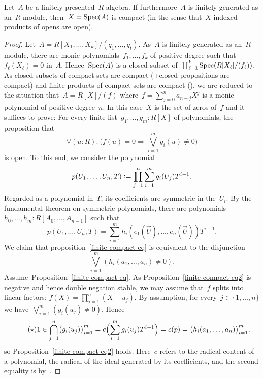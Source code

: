 \begin{proposition}\label{finite-compact}
Let~$A$ be a finitely presented~$R$-algebra. If furthermore~$A$ is finitely
generated as an~$R$-module, then~$X = \operatorname{Spec}(A)$ is compact (in the sense
that~$X$-indexed products of opens are open).\end{proposition}

\begin{proof}Let~$A = R[X_1,\ldots,X_k]/(q_1,\ldots,q_t)$. As~$A$ is finitely
generated as an~$R$-module, there are monic polynomials~$f_1,\ldots,f_k$ of
positive degree such that~$f_\ell(X_\ell) = 0$ in~$A$. Hence~$\operatorname{Spec}(A)$ is a
closed subset of~$\prod_{\ell=1}^k \operatorname{Spec}(R[X_\ell]/(f_\ell))$. As closed
subsets of compact sets are compact (\cite[Lemma 2.0.3]{proper-draft}+closed propositions are compact) and finite products
of compact sets are compact (\cite[Lemma 2.0.3]{proper-draft}), we are reduced to the
situation that~$A = R[X]/(f)$ where~$f = \sum_{j=0}^n a_{n-j} X^j$ is a monic
polynomial of positive degree~$n$. In this case~$X$ is the set of zeros of~$f$
and it suffices to prove: For every finite list~$g_1,\ldots,g_m : R[X]$ of
polynomials, the proposition that
\begin{equation}\label{finite-compact-eq}
  \tag{$\dagger$}
  \forall(u : R).\ \bigl(f(u) = 0 \Rightarrow \bigvee_{i=1}^m g_i(u) \neq 0\bigr)
\end{equation}
is open. To this end, we consider the polynomial
\[ p(U_1,\ldots,U_n,T) \vcentcolon= \prod_{j=1}^n \sum_{i=1}^m g_i(U_j) T^{i-1}. \]
Regarded as a polynomial in~$T$, its coefficients are symmetric in the~$U_i$.
By the fundamental theorem on symmetric polynomials, there are
polynomials~$h_0,\ldots,h_m : R[A_0,\ldots,A_{n-1}]$ such that
\[ p(U_1,\ldots,U_n,T) = \sum_{i=1}^m h_i(e_1(\vec U),\ldots,e_n(\vec U)) T^{i-1}. \]
We claim that proposition~\eqref{finite-compact-eq} is equivalent to the
disjunction
\begin{equation}\label{finite-compact-eq2}
  \tag{$\ddagger$}
  \bigvee_{i=1}^m (h_i(a_1,\ldots,a_n) \neq 0).
\end{equation}
Assume~Proposition~\eqref{finite-compact-eq}. As
Proposition~\eqref{finite-compact-eq2} is negative and hence double
negation stable, we may assume that~$f$ splits into linear factors: $f(X) =
\prod_{j=1}^n (X-u_j)$. By assumption, for every~$j \in \{1,\ldots,n\}$ we
have~$\bigvee_{i=1}^m (g_i(u_j) \neq 0)$. Hence
\begin{equation}\label{finite-compact-eq3}
  \tag{$\star$}
  1 \in \bigcap_{j=1}^n \bigl(g_i(u_j)\bigr)_{i=1}^m = c\Bigl(\sum_{i=1}^m g_i(u_j) T^{i-1}\Bigr) =
  c(p) = \bigl(h_i(a_1,\ldots,a_n)\bigr)_{i=1}^m,
\end{equation}
so Proposition~\eqref{finite-compact-eq2} holds. Here~$c$ refers to the radical
content of a polynomial, the radical of the ideal generated by its
coefficients, and the second equality is
by~\cite[Proposition~1]{banaschewski-vermeulen:radical}.


\end{proof}
